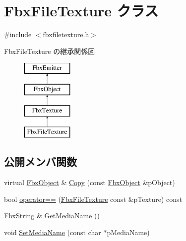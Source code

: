 \hypertarget{class_fbx_file_texture}{}\section{Fbx\+File\+Texture クラス}
\label{class_fbx_file_texture}


{\ttfamily \#include $<$fbxfiletexture.\+h$>$}

Fbx\+File\+Texture の継承関係図\begin{figure}[H]
\begin{center}
\leavevmode
\includegraphics[height=4.000000cm]{class_fbx_file_texture}
\end{center}
\end{figure}
\subsection*{公開メンバ関数}
\begin{DoxyCompactItemize}
\item 
virtual \hyperlink{class_fbx_object}{Fbx\+Object} \& \hyperlink{class_fbx_file_texture_a4ef7372132caebc8d1e5992efb894c9d}{Copy} (const \hyperlink{class_fbx_object}{Fbx\+Object} \&p\+Object)
\item 
bool \hyperlink{class_fbx_file_texture_ab2c5320676da40e302a20ef30326d11a}{operator==} (\hyperlink{class_fbx_file_texture}{Fbx\+File\+Texture} const \&p\+Texture) const
\item 
\hyperlink{class_fbx_string}{Fbx\+String} \& \hyperlink{class_fbx_file_texture_afbd2a201ca55d31987446e33133f53cd}{Get\+Media\+Name} ()
\item 
void \hyperlink{class_fbx_file_texture_a08163cb0f5af0e9dee35a1e758618cad}{Set\+Media\+Name} (const char $\ast$p\+Media\+Name)
\end{DoxyCompactItemize}
